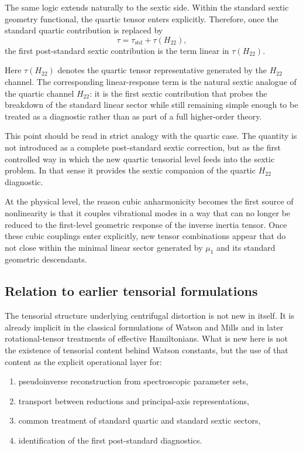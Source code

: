 The same logic extends naturally to the sextic side. Within the
standard sextic geometry functional, the quartic tensor enters
explicitly. Therefore, once the standard quartic contribution is
replaced by
\begin{equation}
\tau = \tau_{\mathrm{std}} + \tau(H_{22}),
\end{equation}
the first post-standard sextic contribution is the term linear in
$\tau(H_{22})$.

Here $\tau(H_{22})$ denotes the quartic tensor representative
generated by the $H_{22}$ channel. The corresponding linear-response
term is the natural sextic analogue of the quartic channel $H_{22}$:
it is the first sextic contribution that probes the breakdown of the
standard linear sector while still remaining simple enough to be
treated as a diagnostic rather than as part of a full higher-order
theory.

This point should be read in strict analogy with the quartic case.
The quantity is not introduced as a complete post-standard sextic
correction, but as the first controlled way in which the new quartic
tensorial level feeds into the sextic problem. In that sense it
provides the sextic companion of the quartic $H_{22}$ diagnostic.

At the physical level, the reason cubic anharmonicity becomes the first
source of nonlinearity is that it couples vibrational modes in a way
that can no longer be reduced to the first-level geometric response of
the inverse inertia tensor. Once these cubic couplings enter
explicitly, new tensor combinations appear that do not close within the
minimal linear sector generated by $\mu_1$ and its standard geometric
descendants.

\subsection{Relation to earlier tensorial formulations}

The tensorial structure underlying centrifugal distortion is not new
in itself. It is already implicit in the classical formulations of
Watson and Mills and in later rotational-tensor treatments of
effective Hamiltonians.\cite{Watson1968,Watson1977,Mills1972,Kirschner1983}
What is new here is not the existence of
tensorial content behind Watson constants, but the use of that content
as the explicit operational layer for:
\begin{enumerate}
\item pseudoinverse reconstruction from spectroscopic parameter sets,
\item transport between reductions and principal-axis representations,
\item common treatment of standard quartic and standard sextic sectors,
\item identification of the first post-standard diagnostics.
\end{enumerate}


